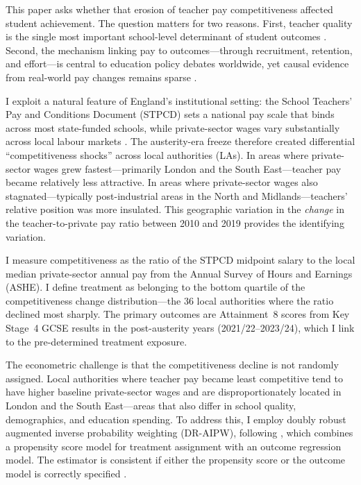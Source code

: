 \documentclass[12pt]{article}
\begin{document}
This paper asks whether that erosion of teacher pay competitiveness affected student achievement. The question matters for two reasons. First, teacher quality is the single most important school-level determinant of student outcomes \citep{rivkin2005teachers, chetty2014measuring1, chetty2014measuring2, hanushek2011economic}. Second, the mechanism linking pay to outcomes---through recruitment, retention, and effort---is central to education policy debates worldwide, yet causal evidence from real-world pay changes remains sparse \citep{dolton2011if, britton2016teacher}.

I exploit a natural feature of England's institutional setting: the School Teachers' Pay and Conditions Document (STPCD) sets a national pay scale that binds across most state-funded schools, while private-sector wages vary substantially across local labour markets \citep{allen2018understanding}. The austerity-era freeze therefore created differential ``competitiveness shocks'' across local authorities (LAs). In areas where private-sector wages grew fastest---primarily London and the South East---teacher pay became relatively less attractive. In areas where private-sector wages also stagnated---typically post-industrial areas in the North and Midlands---teachers' relative position was more insulated. This geographic variation in the \textit{change} in the teacher-to-private pay ratio between 2010 and 2019 provides the identifying variation.

I measure competitiveness as the ratio of the STPCD midpoint salary to the local median private-sector annual pay from the Annual Survey of Hours and Earnings (ASHE). I define treatment as belonging to the bottom quartile of the competitiveness change distribution---the 36 local authorities where the ratio declined most sharply. The primary outcomes are Attainment~8 scores from Key Stage~4 GCSE results in the post-austerity years (2021/22--2023/24), which I link to the pre-determined treatment exposure.

The econometric challenge is that the competitiveness decline is not randomly assigned. Local authorities where teacher pay became least competitive tend to have higher baseline private-sector wages and are disproportionately located in London and the South East---areas that also differ in school quality, demographics, and education spending. To address this, I employ doubly robust augmented inverse probability weighting (DR-AIPW), following \citet{robins1994estimation}, which combines a propensity score model for treatment assignment with an outcome regression model. The estimator is consistent if either the propensity score or the outcome model is correctly specified \citep{heckman1998characterizing}.
\end{document}
